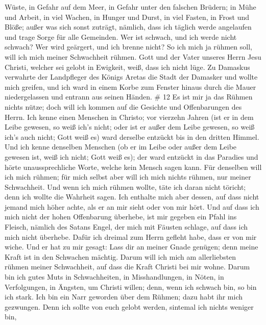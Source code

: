 Wüste, in Gefahr auf dem Meer, in Gefahr unter den falschen Brüdern;
 in Mühe und Arbeit, in viel Wachen, in Hunger und Durst,
in viel Fasten, in Frost und Blöße;  außer was sich sonst
zuträgt, nämlich, dass ich täglich werde angelaufen und trage Sorge für
alle Gemeinden.  Wer ist schwach, und ich werde nicht
schwach? Wer wird geärgert, und ich brenne nicht?  So ich
mich ja rühmen soll, will ich mich meiner Schwachheit rühmen.
 Gott und der Vater unseres Herrn Jesu Christi, welcher sei
gelobt in Ewigkeit, weiß, dass ich nicht lüge.  Zu Damaskus
verwahrte der Landpfleger des Königs Aretas die Stadt der Damasker und
wollte mich greifen,  und ich ward in einem Korbe zum
Fenster hinaus durch die Mauer niedergelassen und entrann aus seinen
Händen. \# 12  Es ist mir ja das Rühmen nichts nütze; doch
will ich kommen auf die Gesichte und Offenbarungen des Herrn.
 Ich kenne einen Menschen in Christo; vor vierzehn Jahren
(ist er in dem Leibe gewesen, so weiß ich's nicht; oder ist er außer dem
Leibe gewesen, so weiß ich's auch nicht; Gott weiß es) ward derselbe
entzückt bis in den dritten Himmel.  Und ich kenne denselben
Menschen (ob er im Leibe oder außer dem Leibe gewesen ist, weiß ich
nicht; Gott weiß es);  der ward entzückt in das Paradies und
hörte unaussprechliche Worte, welche kein Mensch sagen kann.
 Für denselben will ich mich rühmen; für mich selbst aber
will ich mich nichts rühmen, nur meiner Schwachheit.  Und
wenn ich mich rühmen wollte, täte ich daran nicht töricht; denn ich
wollte die Wahrheit sagen. Ich enthalte mich aber dessen, auf dass nicht
jemand mich höher achte, als er an mir sieht oder von mir hört.
 Und auf dass ich mich nicht der hohen Offenbarung überhebe,
ist mir gegeben ein Pfahl ins Fleisch, nämlich des Satans Engel, der
mich mit Fäusten schlage, auf dass ich mich nicht überhebe. 
Dafür ich dreimal zum Herrn gefleht habe, dass er von mir wiche.
 Und er hat zu mir gesagt: Lass dir an meiner Gnade genügen;
denn meine Kraft ist in den Schwachen mächtig. Darum will ich mich am
allerliebsten rühmen meiner Schwachheit, auf dass die Kraft Christi bei
mir wohne.  Darum bin ich gutes Muts in Schwachheiten, in
Misshandlungen, in Nöten, in Verfolgungen, in Ängsten, um Christi
willen; denn, wenn ich schwach bin, so bin ich stark.  Ich
bin ein Narr geworden über dem Rühmen; dazu habt ihr mich gezwungen.
Denn ich sollte von euch gelobt werden, sintemal ich nichts weniger bin,
